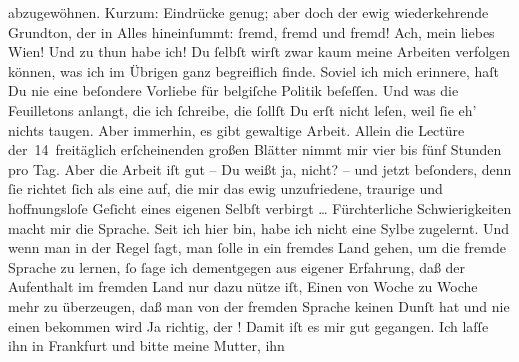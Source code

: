 \begin{ledgroupsized}[t]{13cm}
               abzugewöhnen. Kurzum: Eindrücke genug; aber doch der ewig wiederkehrende Grundton,
               der in Alles hineinſummt: ſremd, fremd und fremd! Ach, mein liebes Wien! {\dotsfive}\pend
           \pstart
           Und zu thun habe ich! Du ſelbſt wirſt zwar kaum meine Arbeiten verfolgen können, was
               ich im Übrigen ganz begreiflich finde. Soviel ich mich erinnere, haſt Du nie eine
               beſondere Vorliebe für belgiſche Politik
               beſeſſen. Und was die Feuilletons anlangt, die ich ſchreibe, die ſollſt Du erſt nicht
               leſen, weil ſie eh’ nichts taugen. Aber immerhin, es gibt gewaltige Arbeit. Allein
               die Lectüre der 14 freitäglich erſcheinenden großen Blätter nimmt mir vier bis fünf
               Stunden pro Tag. Aber die Arbeit iſt gut – Du weißt ja, nicht? – und jetzt beſonders,
               denn ſie richtet ſich als eine \label{K_L02664-9v}\label{K_L02664-9h} auf, die mir das {\pb}ewig unzufriedene, traurige und hoffnungsloſe
               Geſicht eines eigenen Selbſt verbirgt {\dots} Fürchterliche
               Schwierigkeiten macht mir die Sprache. Seit ich hier bin, habe ich nicht eine Sylbe
               zugelernt. Und wenn man in der Regel ſagt, man ſolle in ein fremdes Land gehen, um
               die fremde Sprache zu lernen, ſo ſage ich dementgegen aus eigener Erfahrung, daß der
               Aufenthalt im fremden Land nur dazu nütze iſt, Einen von Woche zu Woche mehr zu
               überzeugen, daß man von der fremden Sprache keinen Dunſt hat und nie einen bekommen
                  wird{\dotsfour}\pend
           \pstart
           Ja richtig, der \label{K_L02664-10v}\label{K_L02664-10h}! Damit iſt
               es mir gut gegangen. Ich laſſe ihn in Frankfurt
               und bitte meine Mutter, ihn

\end{ledgroupsized}
